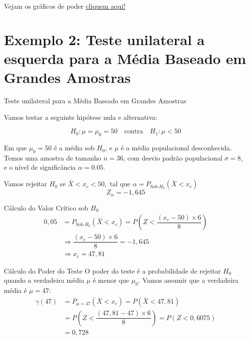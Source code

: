 \documentclass[12pt]{beamer}
\begin{document}
\begin{frame}{}
	\begin{block}{}
Vejam os gráficos de poder \href{https://est711.shinyapps.io/FuncaoPoder/}{cliquem aqui!}
	\end{block}
\end{frame}

\section{Exemplo 2: Teste unilateral a esquerda para a Média Baseado em Grandes Amostras}
\begin{frame}{Teste unilateral para a Média Baseado em Grandes Amostras}
	\begin{block}{}
		\justifying
	Vamos testar a seguinte hipótese nula e alternativa:
	
	\[
	H_0: \mu = \mu_0 = 50 \quad \text{contra} \quad H_1: \mu < 50
	\]
	
	Em que \( \mu_0 = 50 \) é a média sob \( H_0 \), e \( \mu \) é a média populacional desconhecida. Temos uma amostra de tamanho \( n = 36 \), com desvio padrão populacional \( \sigma = 8 \), e o nível de significância \( \alpha = 0.05 \).
	
		
	\end{block}
	\pause
	\begin{block}{}
		\justifying
		Vamos rejeitar $H_0$ se $\bar{X}<x_{c}<50,$ tal que $\alpha=P_{\text{Sob}~H_{0}}(\bar{X}<x_{c})$
		\[
		Z_{\alpha} = -1,645
		\]	
	\end{block}
\end{frame}

\begin{frame}{}
	\begin{block}{Cálculo do Valor Crítico sob $H_{0}$}
		\justifying
		\begin{align*}
			0,05&=P_{\text{Sob}~H_{0}}(\bar{X}<x_{c})=P(Z<\dfrac{(x_{c}-50)\times6}{8})\\
			&\Rightarrow \dfrac{(x_{c}-50)\times6}{8}=-1,645\\
			&\Rightarrow x_{c}=47,81
		\end{align*}
	\end{block}
	\pause
	\begin{block}{Cálculo do Poder do Teste}
		\justifying
		O poder do teste é a probabilidade de rejeitar $H_0$ quando a verdadeira média $\mu$ é menor que $\mu_0$. Vamos assumir que a verdadeira média é $\mu = 47:$
		\begin{align*}
			\gamma(47)&=P_{\mu=47}(\bar{X}<x_{c})=P(\bar{X}<47,81)\\
			&=P(Z<\dfrac{(47,81-47)\times6}{8})=P(Z<0,6075)\\
			&=0,728
		\end{align*}
	\end{block}
\end{frame}
\end{document}
